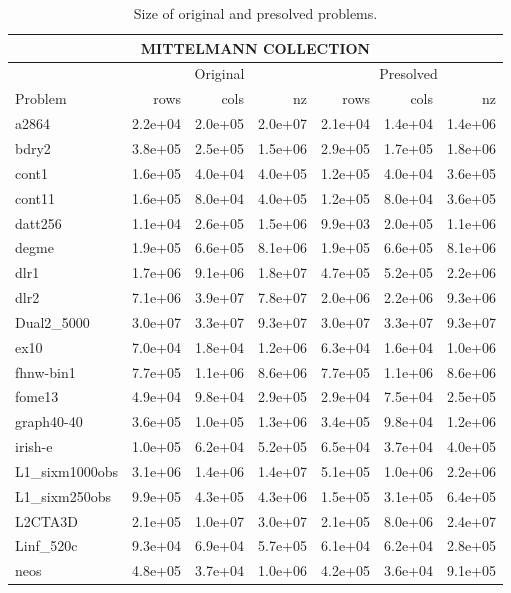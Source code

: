 \documentclass[a4paper]{article}
\newcommand{\0}{\mathbf 0}
\begin{document}
{\tiny
\begin{longtable}{l|rrr|rrr}
\caption{Size of original and presolved problems.}\label{tab:problem_data}\\
\hline
\multicolumn{7}{c}{MITTELMANN COLLECTION} \\
\hline
& \multicolumn{3}{c|}{Original} & \multicolumn{3}{c}{Presolved} \\
\hline
Problem & rows & cols & nz & rows & cols & nz \\
\hline
a2864 & 2.2e+04 & 2.0e+05 & 2.0e+07 & 2.1e+04 & 1.4e+04 & 1.4e+06 \\
bdry2 & 3.8e+05 & 2.5e+05 & 1.5e+06 & 2.9e+05 & 1.7e+05 & 1.8e+06 \\
cont1 & 1.6e+05 & 4.0e+04 & 4.0e+05 & 1.2e+05 & 4.0e+04 & 3.6e+05 \\
cont11 & 1.6e+05 & 8.0e+04 & 4.0e+05 & 1.2e+05 & 8.0e+04 & 3.6e+05 \\
datt256 & 1.1e+04 & 2.6e+05 & 1.5e+06 & 9.9e+03 & 2.0e+05 & 1.1e+06 \\
degme & 1.9e+05 & 6.6e+05 & 8.1e+06 & 1.9e+05 & 6.6e+05 & 8.1e+06 \\
dlr1 & 1.7e+06 & 9.1e+06 & 1.8e+07 & 4.7e+05 & 5.2e+05 & 2.2e+06 \\
dlr2 & 7.1e+06 & 3.9e+07 & 7.8e+07 & 2.0e+06 & 2.2e+06 & 9.3e+06 \\
Dual2\_5000 & 3.0e+07 & 3.3e+07 & 9.3e+07 & 3.0e+07 & 3.3e+07 & 9.3e+07 \\
ex10 & 7.0e+04 & 1.8e+04 & 1.2e+06 & 6.3e+04 & 1.6e+04 & 1.0e+06 \\
fhnw-bin1 & 7.7e+05 & 1.1e+06 & 8.6e+06 & 7.7e+05 & 1.1e+06 & 8.6e+06 \\
fome13 & 4.9e+04 & 9.8e+04 & 2.9e+05 & 2.9e+04 & 7.5e+04 & 2.5e+05 \\
graph40-40 & 3.6e+05 & 1.0e+05 & 1.3e+06 & 3.4e+05 & 9.8e+04 & 1.2e+06 \\
irish-e & 1.0e+05 & 6.2e+04 & 5.2e+05 & 6.5e+04 & 3.7e+04 & 4.0e+05 \\
L1\_sixm1000obs & 3.1e+06 & 1.4e+06 & 1.4e+07 & 5.1e+05 & 1.0e+06 & 2.2e+06 \\
L1\_sixm250obs & 9.9e+05 & 4.3e+05 & 4.3e+06 & 1.5e+05 & 3.1e+05 & 6.4e+05 \\
L2CTA3D & 2.1e+05 & 1.0e+07 & 3.0e+07 & 2.1e+05 & 8.0e+06 & 2.4e+07 \\
Linf\_520c & 9.3e+04 & 6.9e+04 & 5.7e+05 & 6.1e+04 & 6.2e+04 & 2.8e+05 \\
neos & 4.8e+05 & 3.7e+04 & 1.0e+06 & 4.2e+05 & 3.6e+04 & 9.1e+05 \\

\end{longtable}}
\end{document}
